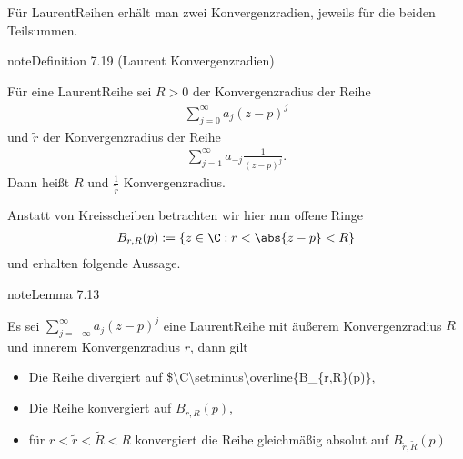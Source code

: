 \documentclass[letterpaper,10pt,german]{jupyterBook}
\begin{document}
\sphinxAtStartPar
Für Laurent\sphinxhyphen{}Reihen erhält man zwei Konvergenzradien, jeweils für die beiden Teilsummen.
\label{complexanalysis/residuensatz:definition-3}
\begin{sphinxadmonition}{note}{Definition 7.19 (Laurent Konvergenzradien)}



\sphinxAtStartPar
Für eine Laurent\sphinxhyphen{}Reihe sei \(R>0\) der Konvergenzradius der Reihe
\begin{equation*}
\begin{split}\sum_{j=0}^\infty a_j (z-p)^j\end{split}
\end{equation*}
\sphinxAtStartPar
und \(\tilde{r}\) der Konvergenzradius der Reihe
\begin{equation*}
\begin{split}\sum_{j=1}^\infty a_{-j} \frac{1}{(z-p)^j}.\end{split}
\end{equation*}
\sphinxAtStartPar
Dann heißt \(R\)  und \(\frac{1}{\tilde{r}}\)  Konvergenzradius.
\end{sphinxadmonition}

\sphinxAtStartPar
Anstatt von Kreisscheiben betrachten wir hier nun offene Ringe
\begin{equation*}
\begin{split}B_{r,R}(p) := \{z\in \C: r< \abs{z-p} < R\}\end{split}
\end{equation*}
\sphinxAtStartPar
und erhalten folgende Aussage.
\label{complexanalysis/residuensatz:lemma-4}
\begin{sphinxadmonition}{note}{Lemma 7.13}



\sphinxAtStartPar
Es sei \(\sum_{j=-\infty}^\infty a_j (z-p)^j\) eine Laurent\sphinxhyphen{}Reihe mit äußerem Konvergenzradius \(R\) und innerem Konvergenzradius \(r\), dann gilt
\begin{itemize}
\item {} 
\sphinxAtStartPar
Die Reihe divergiert auf \$\textbackslash{}C\textbackslash{}setminus\textbackslash{}overline\{B\_\{r,R\}(p)\},

\item {} 
\sphinxAtStartPar
Die Reihe konvergiert auf \(B_{r,R}(p)\),

\item {} 
\sphinxAtStartPar
für \(r<\tilde{r}<\tilde{R}< R\) konvergiert die Reihe gleichmäßig absolut auf \(B_{\tilde{r},\tilde{R}}(p)\)

\end{itemize}
\end{sphinxadmonition}
\end{document}
